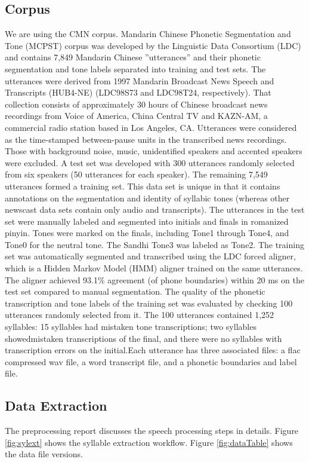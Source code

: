 \documentclass[conference]{IEEEtran}
\begin{document}
\subsection{Corpus}
We are using the CMN corpus. Mandarin Chinese Phonetic Segmentation and Tone (MCPST) corpus
was developed by the Linguistic Data Consortium (LDC) and contains 7,849 Mandarin Chinese ”utterances” and their phonetic segmentation and tone labels separated into training and test sets. The utterances were derived from 1997 Mandarin Broadcast News Speech and Transcripts (HUB4-NE) (LDC98S73 and LDC98T24, respectively). That collection consists of approximately 30 hours of Chinese broadcast news recordings from Voice of America, China Central TV and KAZN-AM, a commercial radio station based in Los Angeles, CA. Utterances were considered as the time-stamped between-pause units in the
transcribed news recordings. Those with background noise, music, unidentified speakers and accented speakers were excluded. A test set was developed with 300 utterances randomly selected from six speakers (50 utterances for each speaker). The remaining 7,549 utterances formed a training set. This data set is unique in that it contains annotations on the segmentation and
identity of syllabic tones (whereas other newscast data sets contain only audio and transcripts). The utterances in the test set were manually labeled and segmented into initials and finals in romanized pinyin. Tones were marked on the finals, including Tone1 through Tone4, and Tone0 for the neutral tone. The Sandhi Tone3 was labeled as Tone2. The training set was automatically segmented and transcribed using the LDC forced aligner, which is a Hidden Markov Model (HMM) aligner trained on the same utterances. The aligner achieved 93.1\% agreement (of phone boundaries) within 20 ms on the test set compared to manual segmentation. The quality of the phonetic transcription and tone labels of the training set was evaluated by checking 100 utterances randomly selected from it. The 100 utterances contained 1,252 syllables: 15 syllables had mistaken tone transcriptions; two syllables showedmistaken transcriptions of the final, and there were no syllables with transcription errors on the initial.Each utterance has three associated files: a flac compressed wav file, a word transcript file, and a phonetic boundaries and label file.

\subsection {Data Extraction}
The preprocessing report discusses the speech processing steps in details. Figure \ref{fig:sylext} shows the syllable extraction workflow. Figure \ref{fig:dataTable} shows the data file versions.
\end{document}
